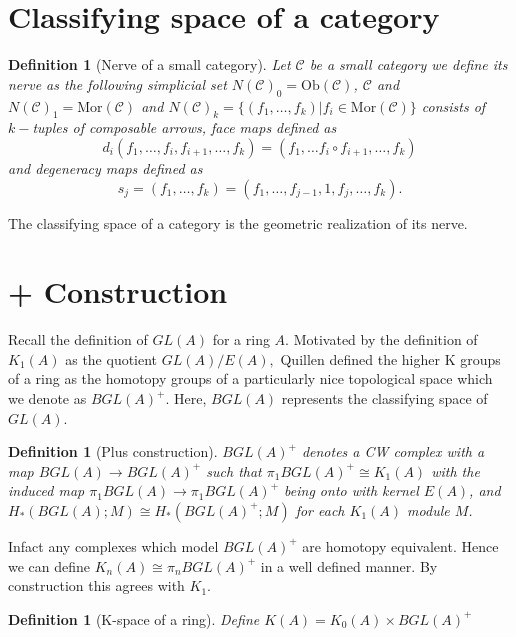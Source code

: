 \documentclass[12pt]{report}
\numberwithin{equation}{section}
\newtheorem{definition}[dummy]{Definition}
\begin{document}
	\section{Classifying space of a category}
	\begin{definition}[Nerve of a small category]
	Let $\mathcal{C}$ be a small category we define its nerve as the following simplicial set $N(\mathcal{C})_0=\mathrm{Ob}(\mathcal{C})$, $\mathcal{C}$ and $N(\mathcal{C})_1 = \mathrm{Mor}(\mathcal{C})$ and $N(\mathcal{C})_k=\{(f_1,\ldots,f_k)| f_i \in \mathrm{Mor}(\mathcal{C})\}$ consists of $k-$tuples of composable arrows, face maps defined as $$d_i(f_1,\ldots, f_i,f_{i+1}, \ldots, f_k)=(f_1,\ldots f_i\circ f_{i+1}, \ldots, f_k)$$ and degeneracy maps defined as $$s_j=(f_1,\ldots,f_k)=(f_1,\ldots,f_{j-1}, 1, f_j,\ldots,f_k).$$
	\end{definition}
	The classifying space of a category is the geometric realization of its nerve.
	
	\section{+ Construction}
	Recall the definition of $GL(A)$ for a ring $A$. Motivated by the definition of $K_1(A) $ as the quotient $GL(A)/E(A),$ Quillen defined the higher K groups of a ring as the homotopy groups of a particularly nice topological space which we denote as $BGL(A)^+$. Here, $BGL(A)$ represents the classifying space of $GL(A)$.
	
	\begin{definition}[Plus construction]
		$BGL(A)^+$ denotes a CW complex with a map $BGL(A)\to BGL(A)^+$ such that $\pi_1 BGL(A)^+ \cong K_1(A)$ with the induced map $\pi_1BGL(A) \to \pi_1 BGL(A)^+$ being onto with kernel $E(A)$, and $H_*(BGL(A);	M) \cong H_*(BGL(A)^+;M) $ for each $K_1(A)$ module $M$.
	\end{definition}
	Infact any complexes which model $BGL(A)^+$ are homotopy equivalent. Hence we can define $K_n(A)\cong \pi_n BGL(A)^+$ in a well defined manner. By construction this agrees with $K_1$.
	\begin{definition}[K-space of a ring]
		Define $K(A) = K_0(A)\times BGL(A)^+$
	\end{definition}
	
\end{document}

